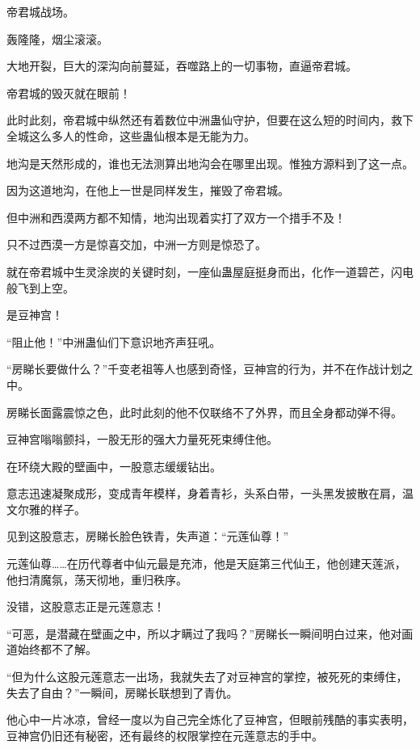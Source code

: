 
\begin{this_body}

帝君城战场。

轰隆隆，烟尘滚滚。

大地开裂，巨大的深沟向前蔓延，吞噬路上的一切事物，直逼帝君城。

帝君城的毁灭就在眼前！

此时此刻，帝君城中纵然还有着数位中洲蛊仙守护，但要在这么短的时间内，救下全城这么多人的性命，这些蛊仙根本是无能为力。

地沟是天然形成的，谁也无法测算出地沟会在哪里出现。惟独方源料到了这一点。

因为这道地沟，在他上一世是同样发生，摧毁了帝君城。

但中洲和西漠两方都不知情，地沟出现着实打了双方一个措手不及！

只不过西漠一方是惊喜交加，中洲一方则是惊恐了。

就在帝君城中生灵涂炭的关键时刻，一座仙蛊屋庭挺身而出，化作一道碧芒，闪电般飞到上空。

是豆神宫！

“阻止他！”中洲蛊仙们下意识地齐声狂吼。

“房睇长要做什么？”千变老祖等人也感到奇怪，豆神宫的行为，并不在作战计划之中。

房睇长面露震惊之色，此时此刻的他不仅联络不了外界，而且全身都动弹不得。

豆神宫嗡嗡颤抖，一股无形的强大力量死死束缚住他。

在环绕大殿的壁画中，一股意志缓缓钻出。

意志迅速凝聚成形，变成青年模样，身着青衫，头系白带，一头黑发披散在肩，温文尔雅的样子。

见到这股意志，房睇长脸色铁青，失声道：“元莲仙尊！”

元莲仙尊……在历代尊者中仙元最是充沛，他是天庭第三代仙王，他创建天莲派，他扫清魔氛，荡天彻地，重归秩序。

没错，这股意志正是元莲意志！

“可恶，是潜藏在壁画之中，所以才瞒过了我吗？”房睇长一瞬间明白过来，他对画道始终都不了解。

“但为什么这股元莲意志一出场，我就失去了对豆神宫的掌控，被死死的束缚住，失去了自由？”一瞬间，房睇长联想到了青仇。

他心中一片冰凉，曾经一度以为自己完全炼化了豆神宫，但眼前残酷的事实表明，豆神宫仍旧还有秘密，还有最终的权限掌控在元莲意志的手中。


\end{this_body}
